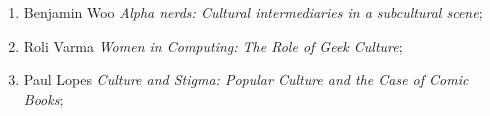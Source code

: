 \documentclass[a4paper,11pt]{article}
\begin{document}
\begin{enumerate}
\item Benjamin Woo \textit{Alpha nerds: Cultural intermediaries in a
    subcultural scene};



\item Roli Varma \textit{Women in Computing: The Role of Geek Culture};



\item Paul Lopes \textit{Culture and Stigma: Popular Culture and the Case
    of Comic Books};

































































































\end{enumerate}
\end{document}
